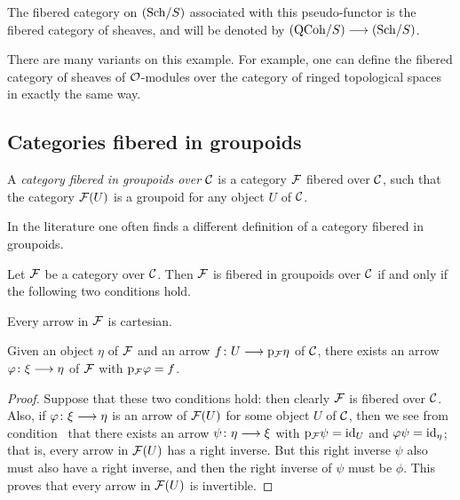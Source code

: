 \begin{3   FIBERED CATEGORIES}
\begin{3.2 Examples of fibered categories}
The fibered category on $({\mathrm{Sch}/S})$ associated with this pseudo-functor is the fibered category of \qc sheaves, and will be denoted by $\catqc{S} \arr \catsch{S}$.

There are many variants on  this example. For example, one can define the fibered category of sheaves of $\mathcal{O}$-modules over the category of ringed topological spaces in exactly the same way.









\end{3.2 Examples of fibered categories}
\begin{3.3 Categories fibered in groupoids}
\setcounter{section}{2}
\section{Categories fibered in groupoids}
\setcounter{theorem}{20}
\begin{definition} A \emph{category fibered in groupoids over $\mathcal{C}$}%
%
 is a category $\mathcal{F}$ fibered over $\mathcal{C}$, such that the category $\mathcal{F}(U)$ is a groupoid for any object $U$ of $\mathcal{C}$.
\end{definition}

In the literature one often finds a different definition of a category fibered in groupoids.

\begin{proposition} Let $\mathcal{F}$ be a category over $\mathcal{C}$. Then $\mathcal{F}$ is fibered in groupoids over $\mathcal{C}$ if and only if the following two conditions hold.

\begin{enumeratei}
 Every arrow in $\mathcal{F}$ is cartesian.

 Given an object $\eta$ of $\mathcal{F}$ and an arrow $f \colon U \arr \p_\cF \eta$ of $\mathcal{C}$, there exists an arrow $\phi \colon \xi \arr \eta$ of $\mathcal{F}$ with $\mathrm{p}_{\mathcal{F}} \varphi = f$.
\end{enumeratei}
\end{proposition}

\begin{proof} Suppose that these two conditions hold: then clearly $\mathcal{F}$ is fibered over $\mathcal{C}$. Also, if $\phi\colon \xi \arr \eta $ is an arrow of $\mathcal{F}(U)$ for some object $U$ of $\mathcal{C}$, then we see from condition~ that there exists an arrow $\psi\colon \eta \arr \xi$ with $\mathrm{p}_{\mathcal{F}} \psi = \mathrm{id}_U$ and $\varphi\psi = \mathrm{id}_\eta$; that is, every arrow in $\mathcal{F}(U)$ has a right inverse. But this right inverse $\psi$ also must also have a right inverse, and then the right inverse of $\psi$ must be $\phi$. This proves that every arrow in $\mathcal{F}(U)$ is invertible.


\end{proof}
\end{3.3 Categories fibered in groupoids}
\end{3   FIBERED CATEGORIES}
